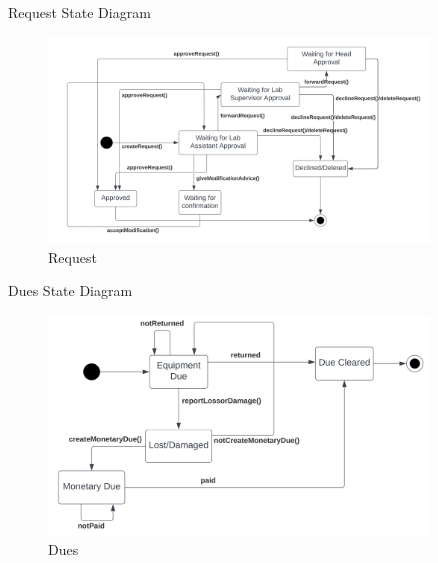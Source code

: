 \documentclass[20pt]{beamer}
\numberwithin{figure}{section}
\begin{document}
\begin{frame}{Request State Diagram}

     \begin{figure}
        \centering
        \includegraphics[width= 0.9\textwidth , height= 0.6\paperheight]{RequestState.png}
        \caption{Request}
        \label{fig:38}
    \end{figure}

\end{frame}

\begin{frame}{Dues State Diagram}

     \begin{figure}
        \centering
        \includegraphics[width= 0.9\textwidth , height= 0.6\paperheight]{DuesState.png}
        \caption{Dues}
        \label{fig:39}
    \end{figure}

\end{frame}
\end{document}
